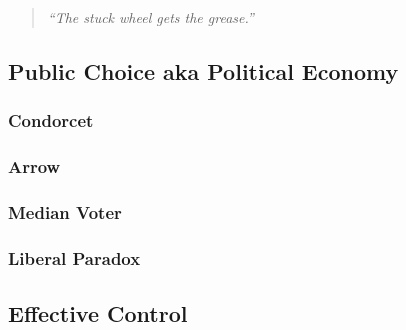 \begin{quote}
	\emph{``The stuck wheel gets the grease.''}
\end{quote}

	\subsection[Public Choice]{Public Choice aka Political Economy}



		\subsubsection{Condorcet}

		\subsubsection{Arrow}

		\subsubsection{Median Voter}

		\subsubsection{Liberal Paradox}

	\subsection[Effective Control]{Effective Control}

